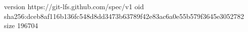 version https://git-lfs.github.com/spec/v1
oid sha256:dceb8af116b136fc548d8dd3473b63789f42e83ac6a0e55b579f3645e3052782
size 196704
